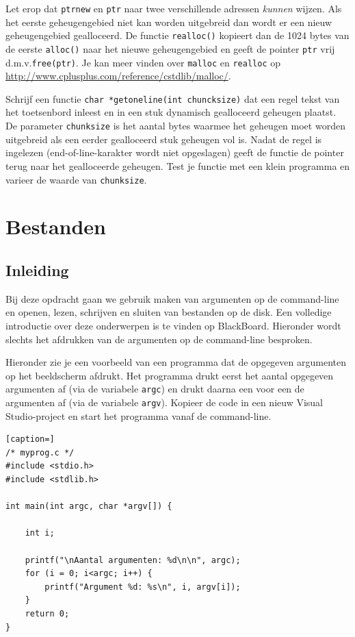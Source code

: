 \documentclass[a4paper,10pt,fleqn,twoside]{article}
\begin{document}
Let erop dat \lstinline|ptrnew| en \lstinline|ptr| naar twee verschillende adressen \textsl{kunnen} wijzen. Als het eerste geheugengebied niet kan worden uitgebreid dan wordt er een nieuw geheugengebied gealloceerd. De functie \lstinline|realloc()| kopieert dan de 1024 bytes van de eerste \lstinline|alloc()| naar het nieuwe geheugengebied en geeft de pointer \lstinline|ptr| vrij d.m.v.\@ \lstinline|free(ptr)|. Je kan meer vinden over \lstinline|malloc| en \lstinline|realloc| op 
\url{http://www.cplusplus.com/reference/cstdlib/malloc/}.

Schrijf een functie \lstinline|char *getoneline(int chuncksize)| dat een regel tekst van het toetsenbord inleest en in een stuk dynamisch gealloceerd geheugen plaatst. De parameter \lstinline|chunksize| is het aantal bytes waarmee het geheugen moet worden uitgebreid als een eerder gealloceerd stuk geheugen vol is. Nadat de regel is ingelezen (end-of-line-karakter wordt niet opgeslagen) geeft de functie de pointer terug naar het gealloceerde geheugen. Test je functie met een klein programma en varieer de waarde van \lstinline|chunksize|.


\clearpage
\section{Bestanden}

\subsection{Inleiding}
Bij deze opdracht gaan we gebruik maken van argumenten op de command-line en openen, lezen, schrijven en sluiten van bestanden op de disk. Een volledige introductie over deze onderwerpen is te vinden op BlackBoard. Hieronder wordt slechts het afdrukken van de argumenten op de command-line besproken.

Hieronder zie je een voorbeeld van een programma dat de opgegeven argumenten op het beeldscherm afdrukt. Het programma drukt eerst het aantal opgegeven argumenten af (via de variabele \lstinline|argc|) en drukt daarna een voor een de argumenten af (via de variabele \lstinline|argv|).
Kopieer de code in een nieuw Visual Studio-project en start het programma vanaf de command-line.

\begin{lstlisting}[caption=]
/* myprog.c */
#include <stdio.h>
#include <stdlib.h>

int main(int argc, char *argv[]) {

    int i;

    printf("\nAantal argumenten: %d\n\n", argc);
    for (i = 0; i<argc; i++) {
        printf("Argument %d: %s\n", i, argv[i]);
    }
    return 0;
}
\end{lstlisting}
\end{document}
